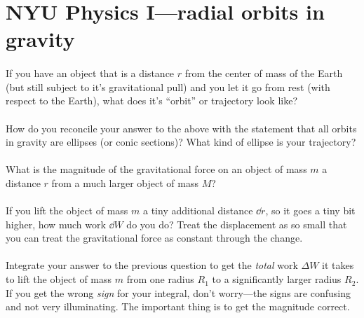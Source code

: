 \documentclass[12pt]{article}
\begin{document}
\section*{NYU Physics I---radial orbits in gravity}

\paragraph{\theproblem}%
If you have an object that is a distance $r$ from the center of mass
of the Earth (but still subject to it's gravitational pull) and you
let it go from rest (with respect to the Earth), what does it's
``orbit'' or trajectory look like?

\paragraph{\theproblem}%
How do you reconcile your answer to the above with the statement that
all orbits in gravity are ellipses (or conic sections)?  What kind of
ellipse is your trajectory?

\paragraph{\theproblem}%
What is the magnitude of the gravitational force on an object of mass
$m$ a distance $r$ from a much larger object of mass $M$?

\paragraph{\theproblem}%
If you lift the object of mass $m$ a tiny additional distance $\dd r$,
so it goes a tiny bit higher, how much work $\dd W$ do you do?
Treat the displacement as so small that you can treat the
gravitational force as constant through the change.

\paragraph{\theproblem}%
Integrate your answer to the previous question to get the \emph{total}
work $\Delta W$ it takes to lift the object of mass $m$ from one
radius $R_1$ to a significantly larger radius $R_2$.  If you get the
wrong \emph{sign} for your integral, don't worry---the signs are
confusing and not very illuminating.  The important thing is to get
the magnitude correct.
\end{document}
